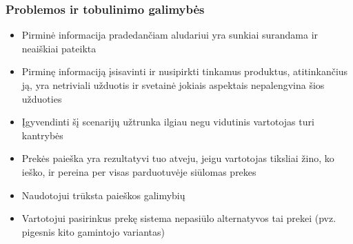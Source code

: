 \documentclass[oneside]{VUMIFPSkursinis}
\begin{document}
		\subsubsection{Problemos ir tobulinimo galimybės}
					\begin{itemize}
						\item{Pirminė informacija pradedančiam aludariui yra sunkiai surandama ir neaiškiai pateikta}
						\item{Pirminę informaciją įsisavinti ir nusipirkti tinkamus produktus, atitinkančius ją, yra netriviali užduotis ir svetainė jokiais aspektais nepalengvina šios užduoties}
						\item{Įgyvendinti šį scenarijų užtrunka ilgiau negu vidutinis vartotojas turi kantrybės}
						\item{Prekės paieška yra rezultatyvi tuo atveju, jeigu vartotojas tiksliai žino, ko ieško, ir pereina per visas parduotuvėje siūlomas prekes}
						\item{Naudotojui trūksta paieškos galimybių}
						\item{Vartotojui pasirinkus prekę sistema nepasiūlo alternatyvos tai prekei (pvz. pigesnis kito gamintojo variantas)}
					\end{itemize}
\end{document}
